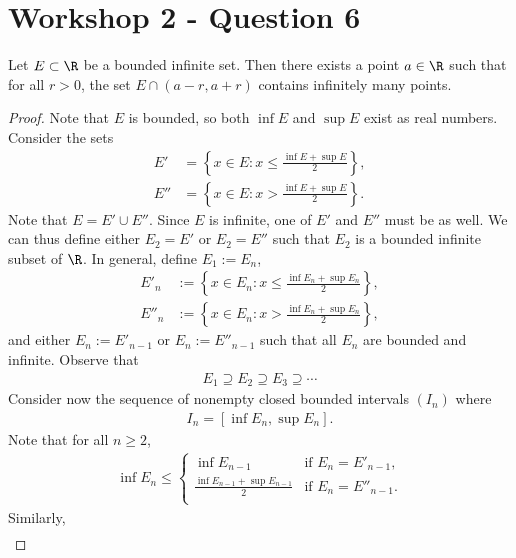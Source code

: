 \documentclass{article}
\begin{document}
\section{Workshop 2 - Question 6}

\begin{claim}
   Let $E\subset\R$ be a bounded infinite set.
   Then there exists a point $a\in\R$ such that for all $r>0$, the set
   $E\cap(a-r, a+r)$ contains infinitely many points.
\end{claim}
\begin{proof}
   Note that $E$ is bounded, so both $\inf E$ and $\sup E$ exist as real numbers.
   Consider the sets
   \begin{align*}
      E' &= \left\lbrace x \in E : x \leq \frac{\inf E + \sup E}{2}\right\rbrace,\\
      E'' &= \left\lbrace x \in E : x > \frac{\inf E + \sup E}{2}\right\rbrace.
   \end{align*}
   Note that $E=E'\cup E''$. Since $E$ is infinite, one of $E'$ and $E''$ must be as well.
   We can thus define either $E_2 = E'$ or $E_2=E''$ such that $E_2$ is a bounded infinite
   subset of $\R$.
   In general, define $E_1 := E_n$,
   \begin{align*}
      E'_n &:= \left\lbrace x \in E_n : x \leq \frac{\inf E_n + \sup E_n}{2}\right\rbrace,\\
      E''_n &:= \left\lbrace x \in E_n : x > \frac{\inf E_n + \sup E_n}{2}\right\rbrace,
   \end{align*}
   and either $E_n:=E'_{n-1}$ or $E_n:=E''_{n-1}$ such that all $E_n$ are bounded and infinite.
   Observe that
   \begin{align*}
      E_1 \supseteq E_2 \supseteq E_3 \supseteq \cdots
   \end{align*}
   Consider now the sequence of nonempty closed bounded intervals $(I_n)$ where
   \begin{align*}
      I_n = [\inf E_n, \sup E_n].
   \end{align*}
   Note that for all $n\geq 2$,
   \begin{align}
      \label{eq1}
      \inf E_n \leq \begin{cases}
         \inf E_{n-1} &\text{if }E_n = E'_{n-1},\\
         \frac{\inf E_{n-1} + \sup E_{n-1}}{2} &\text{if }E_n = E''_{n-1}.\\
      \end{cases}
   \end{align}
   Similarly,
   \begin{align}

\end{align}
\end{proof}
\end{document}

